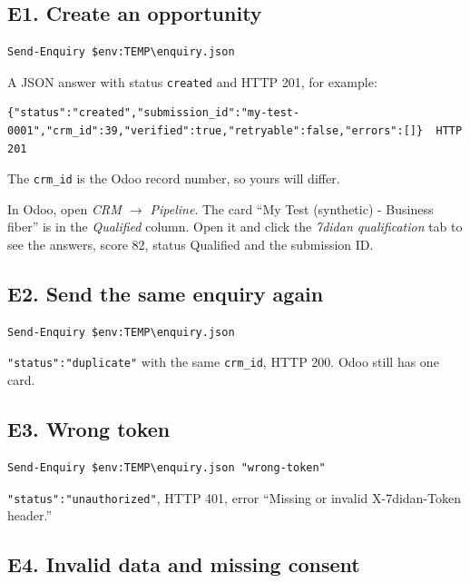 \documentclass[11pt,a4paper]{article}
\newcommand{\f}[1]{\texttt{#1}}
\begin{document}
\subsection{E1. Create an opportunity}
\begin{lstlisting}
Send-Enquiry $env:TEMP\enquiry.json
\end{lstlisting}
\begin{expect}
A JSON answer with status \f{created} and HTTP 201, for example:
\begin{lstlisting}
{"status":"created","submission_id":"my-test-0001","crm_id":39,"verified":true,"retryable":false,"errors":[]}  HTTP 201
\end{lstlisting}
The \f{crm\_id} is the Odoo record number, so yours will differ.
\end{expect}
In Odoo, open \emph{CRM $\rightarrow$ Pipeline}. The card ``My Test (synthetic) - Business fiber'' is in
the \emph{Qualified} column. Open it and click the \emph{7didan qualification} tab to see the answers,
score 82, status Qualified and the submission ID.

\subsection{E2. Send the same enquiry again}
\begin{lstlisting}
Send-Enquiry $env:TEMP\enquiry.json
\end{lstlisting}
\begin{expect}
\f{"status":"duplicate"} with the same \f{crm\_id}, HTTP 200. Odoo still has one card.
\end{expect}

\subsection{E3. Wrong token}
\begin{lstlisting}
Send-Enquiry $env:TEMP\enquiry.json "wrong-token"
\end{lstlisting}
\begin{expect}
\f{"status":"unauthorized"}, HTTP 401, error ``Missing or invalid X-7didan-Token header.''
\end{expect}

\subsection{E4. Invalid data and missing consent}
\end{document}
